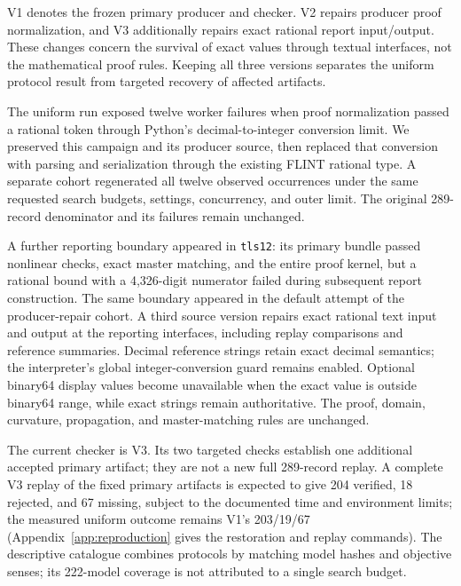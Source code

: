 V1 denotes the frozen primary producer and checker. V2 repairs producer proof
normalization, and V3 additionally repairs exact rational report input/output.
These changes concern the survival of exact values through textual interfaces,
not the mathematical proof rules. Keeping all three versions separates
the uniform protocol result from targeted recovery of affected artifacts.

The uniform run exposed twelve worker failures when proof normalization passed
a rational token through Python's decimal-to-integer conversion limit. We
preserved this campaign and its producer source, then replaced that conversion
with parsing and serialization through the existing FLINT rational type.
A separate cohort regenerated all twelve observed occurrences under the same
requested search budgets, settings, concurrency, and outer limit. The original
289-record denominator and its failures remain unchanged.

A further reporting boundary appeared in \texttt{tls12}: its primary bundle
passed nonlinear checks, exact master matching, and the entire proof kernel,
but a rational bound with a 4,326-digit numerator failed during subsequent
report construction. The same
boundary appeared in the default attempt of the producer-repair cohort.
A third source version repairs exact rational text input and output at the
reporting interfaces, including replay comparisons and reference summaries.
Decimal reference strings retain exact decimal semantics; the interpreter's
global integer-conversion guard remains enabled. Optional binary64 display
values become unavailable when the exact value is outside binary64 range,
while exact strings remain authoritative. The proof, domain, curvature,
propagation, and master-matching rules are unchanged.



The current checker is V3. Its two targeted checks establish one additional
accepted primary artifact; they are not a new full 289-record replay.
A complete V3 replay of the fixed primary artifacts is expected to give
204 verified, 18 rejected, and 67 missing, subject to the documented time and
environment limits; the measured uniform outcome remains V1's 203/19/67
(Appendix~\ref{app:reproduction} gives the restoration and replay commands). The descriptive catalogue combines protocols by matching model
hashes and objective senses; its 222-model coverage is not attributed to a
single search budget.
